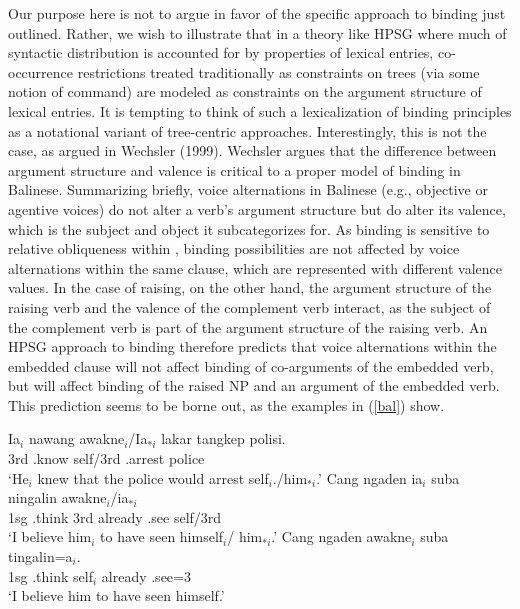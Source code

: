 \documentclass[output=paper]{langsci/langscibook}
\begin{document}
Our purpose here is not to argue in favor of the specific approach to binding just outlined. Rather, we wish to illustrate that in a theory like HPSG where much of syntactic distribution is accounted for by properties of lexical entries, co-occurrence restrictions treated traditionally as constraints on trees (via some notion of command) are modeled as constraints on the argument structure of lexical entries. It is tempting to think of such a lexicalization of binding principles as a notational variant of tree-centric approaches. Interestingly, this is not the case, as argued in Wechsler (1999). Wechsler argues that the difference between argument structure and valence is critical to a proper model of binding in Balinese. Summarizing briefly, voice alternations in Balinese (e.g., objective or agentive voices) do not alter a verb's argument structure but do alter its valence, which is the subject and object it subcategorizes for. As binding is sensitive to relative obliqueness within , binding possibilities are not affected by voice alternations within the same clause, which are represented with different valence values. In the case of raising, on the other hand, the argument structure of the raising verb and the valence of the complement verb interact, as the subject of the complement verb is part of the argument structure of the raising verb. An HPSG approach to binding therefore predicts that voice alternations within the embedded clause will not affect binding of co-arguments of the embedded verb, but will affect binding of the raised NP and an argument of the embedded verb. This prediction seems to be borne out, as the examples in (\ref{bal}) show. 

\begin{exe}
	\ex\label{bal}
	\begin{xlist} 
		\ex\label{bal-a}
		\gll Ia$_{i}$ nawang {awakne$_{i}$/Ia$_{*i}$ } lakar tangkep polisi. \\
		3rd .know self/3rd  .arrest police  \\
		\glt `He$_{i}$ knew that the police would arrest self$_{i}$./him$_{*i}$.'
		\ex\label{bal-b}
		\gll Cang ngaden ia$_{i}$ suba ningalin awakne$_{i}$/ia$_{*i}$ \\
		 1sg .think 3rd already .see self/3rd \\
		\glt `I believe him$_{i}$ to have seen himself$_{i}$/ him$_{*i}$.'
		\ex\label{bal-c}
		\gll Cang ngaden awakne$_{i}$ suba tingalin=a$_{i}$.\\
		1sg .think self$_{i}$ already .see=3 \\
		\glt `I believe him to have seen himself.'
	\end{xlist}
\end{exe} 
\end{document}
